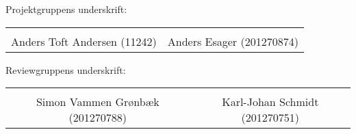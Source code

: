 Projektgruppens underskrift: 
\begin{table}[H]
	\centering
	\begin{tabular}{c c}
		\underline{\phantom{mmmmmmmmmmmmmmmmmmmmm}} & \underline{\phantom{mmmmmmmmmmmmmmmmmmmmm}} \\
		Anders Toft Andersen (11242) \vspace{2cm} & Anders Esager (201270874) \vspace{2cm}\\
	\end{tabular}
\end{table}
Reviewgruppens underskrift:
\begin{table}[H]
	\centering
	\begin{tabular}{c c}
		\underline{\phantom{mmmmmmmmmmmmmmmmmmmmm}} & \underline{\phantom{mmmmmmmmmmmmmmmmmmmmm}} \\
		Simon Vammen Grønbæk (201270788) \vspace{2cm} & Karl-Johan Schmidt (201270751) \vspace{2cm}\\
	\end{tabular}
\end{table}
